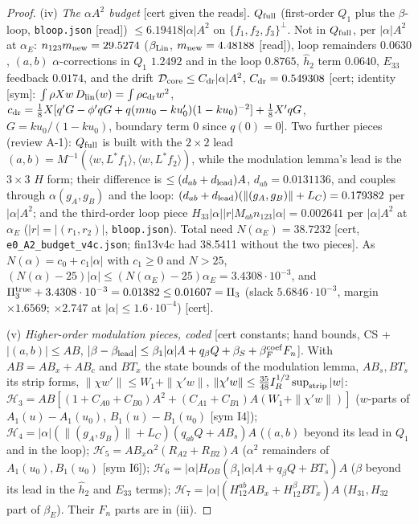 \documentclass[10pt]{article}
\newcommand{\ip}[2]{\langle #1,#2\rangle}
\begin{document}
\begin{proof}
(iv) \emph{The $\alpha A^2$ budget} [cert given the reads]. $Q_{\rm full}$ (first-order $Q_1$ plus the $\beta$-loop, \texttt{bloop.json} [read]) $\le6.19418|\alpha|A^2$ on
$\{f_1,f_2,f_3\}^\perp$. Not in $Q_{\rm full}$, per $|\alpha|A^2$ at $\alpha_E$: $n_{123}m_{\rm new}=29.5274$ ($\beta_{\rm Lin}$, $m_{\rm new}=4.48188$ [read]),
loop remainders $0.0630$, $(a,b)$ $\alpha$-corrections in $Q_1$ $1.2492$ and in the loop $0.8765$, $\hat h_2$ term $0.0640$, $E_{33}$ feedback $0.0174$, and the drift
$\mathcal D_{\rm core}\le C_{\rm dr}|\alpha|A^2$, $C_{\rm dr}=0.549308$ [cert; identity [sym]: $\int\rho Xw\,D_{\rm lin}(w)=\int\rho c_{\rm dr}w^2$,
$c_{\rm dr}=\tfrac18X[q'G-\phi'qG+q(mu_0-ku_0')(1-ku_0)^{-2}]+\tfrac18X'qG$, $G=ku_0/(1-ku_0)$, boundary term 0 since $q(0)=0$].
Two further pieces (review A-1): $Q_{\rm full}$ is built with the $2\times2$ lead $(a,b)=M^{-1}(\ip{w}{L^*f_1},\ip{w}{L^*f_2})$, while the modulation lemma's lead is the
$3\times3$ $H$ form; their difference is $\le(d_{ab}+d_{\rm lead})A$, $d_{ab}=0.0131136$, and couples through $\alpha(g_A,g_B)$ and the loop:
$(d_{ab}+d_{\rm lead})(\|(g_A,g_B)\|+L_C)=0.179382$ per $|\alpha|A^2$; and the third-order loop piece $H_{33}|\alpha||r|M_{ab}n_{123}|\alpha|=0.002641$ per $|\alpha|A^2$
at $\alpha_E$ ($|r|=|(r_1,r_2)|$, \texttt{bloop.json}). Total need $N(\alpha_E)=38.7232$ [cert, \texttt{e0\_A2\_budget\_v4c.json}; fin13v4c had 38.5411 without the two pieces].
As $N(\alpha)=c_0+c_1|\alpha|$ with $c_1\ge0$ and $N>25$, $(N(\alpha)-25)|\alpha|\le(N(\alpha_E)-25)\alpha_E=3.4308\cdot10^{-3}$, and
$\Pi_3^{\rm true}+3.4308\cdot10^{-3}=0.01382\le0.01607=\Pi_3$ (slack $5.6846\cdot10^{-3}$, margin $\times1.6569$; $\times2.747$ at $|\alpha|\le1.6\cdot10^{-4}$) [cert].

(v) \emph{Higher-order modulation pieces, coded} [cert constants; hand bounds, CS + $|(a,b)|\le AB$, $|\beta-\beta_{\rm lead}|\le\beta_1|\alpha|A+q_\beta Q+\beta_S+\beta_F^{\rm coef}F_n$].
With $AB=AB_x+AB_c$ and $BT_x$ the state bounds of the modulation lemma, $AB_s,BT_s$ its strip forms, $\|\chi w'\|\le W_1+\|\chi'w\|$, $\|\chi'w\|\le\tfrac{35}{48}I_R^{1/2}\sup_{\rm strip}|w|$:
$\mathcal H_3=AB[(1+C_{A0}+C_{B0})A^2+(C_{A1}+C_{B1})A(W_1+\|\chi'w\|)]$ ($w$-parts of $A_1(u)-A_1(u_0)$, $B_1(u)-B_1(u_0)$ [sym I4]);
$\mathcal H_4=|\alpha|(\|(g_A,g_B)\|+L_C)(q_{ab}Q+AB_s)A$ ($(a,b)$ beyond its lead in $Q_1$ and in the loop);
$\mathcal H_5=AB_x\alpha^2(R_{A2}+R_{B2})A$ ($\alpha^2$ remainders of $A_1(u_0),B_1(u_0)$ [sym I6]);
$\mathcal H_6=|\alpha|H_{OB}(\beta_1|\alpha|A+q_\beta Q+BT_s)A$ ($\beta$ beyond its lead in the $\hat h_2$ and $E_{33}$ terms);
$\mathcal H_7=|\alpha|(H_{12}^{ab}AB_x+H_{12}^{\beta}BT_x)A$ ($H_{31},H_{32}$ part of $\beta_E$). Their $F_n$ parts are in (iii).
\end{proof}
\end{document}
